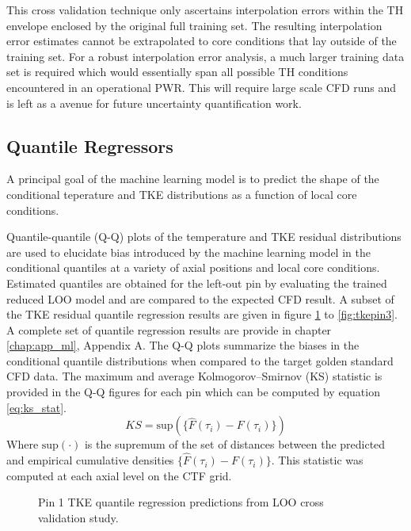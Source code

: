 This cross validation technique only ascertains interpolation errors within the TH envelope enclosed by the original full training set.  The resulting interpolation error estimates cannot be extrapolated to core conditions that lay outside of the training set.  For a robust interpolation error analysis, a much larger training data set is required which would essentially span all possible TH conditions encountered in an operational PWR.  This will require large scale CFD runs and is left as a avenue for future uncertainty quantification work.

\subsection{Quantile Regressors}

A principal goal of the machine learning model is to predict the shape of the conditional teperature and TKE distributions as a function of local core conditions.

Quantile-quantile (Q-Q) plots of the  temperature and TKE residual distributions are used to elucidate bias introduced by the machine learning model in the conditional quantiles at a variety of axial positions and local core conditions.  Estimated quantiles are obtained for the left-out pin by evaluating the trained reduced LOO model and are compared to the expected CFD result.
A subset of the TKE residual quantile regression results are given in figure \ref{fig:tkepin1} to \ref{fig:tkepin3}.  A complete set of quantile regression results are provide in chapter \ref{chap:app_ml}, Appendix A. The Q-Q plots summarize the biases in the conditional quantile distributions when compared to the target golden standard CFD data.  The maximum and average Kolmogorov–Smirnov (KS) statistic is provided in the Q-Q figures for each pin which can be computed by equation \ref{eq:ks_stat}.
\begin{equation}
KS = \mathrm{sup}(\{\hat F(\tau_i) - F(\tau_i)\})
\label{eq:ks_stat}
\end{equation}
Where $\mathrm{sup}(\cdot)$ is the supremum of the set of distances between the predicted and empirical cumulative densities $\{\hat F(\tau_i) - F(\tau_i)\}$.
This statistic was computed at each axial level on the CTF grid.

\begin{figure}[H]%
    \centering
    \qquad
    \caption[Q-Q LOO TKE pin 1 results.]{Pin 1 TKE quantile regression predictions from LOO cross validation study.}%
    \label{fig:tkepin1}%
\end{figure}

